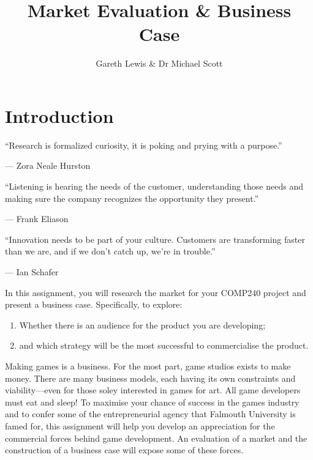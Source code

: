 \documentclass{../../fal_assignment}
\title{Market Evaluation \& Business Case}
\author{Gareth Lewis \& Dr Michael Scott}
\begin{document}
\maketitle

\section*{Introduction}

\begin{marginquote}
  ``Research is formalized curiosity, it is poking and prying with a purpose.''
  
   --- Zora Neale Hurston
   
    \marginquoterule
    
    ``Listening is hearing the needs of the customer, understanding those needs and making sure the company recognizes the opportunity they present.''
    
    --- Frank Eliason
    
    \marginquoterule
    
    ``Innovation needs to be part of your culture. Customers are transforming faster than we are, and if we don't catch up, we're in trouble.''
    
    --- Ian Schafer
      
\end{marginquote}

In this assignment, you will research the market for your COMP240 project and present a business case. Specifically, to explore: 

\begin{enumerate}[label=(\roman*)]
    \item Whether there is an audience for the product you are developing;
    \item and which strategy will be the most successful to commercialise the product.
\end{enumerate}

Making games is a business. For the most part, game studios exists to make money. There are many business models, each having its own constraints and viability---even for those soley interested in games for art. All game developers must eat and sleep! To maximise your chance of success in the games industry and to confer some of the entrepreneurial agency that Falmouth University is famed for, this assignment will help you develop an appreciation for the commercial forces behind game development. An evaluation of a market and the construction of a business case will expose some of these forces.
\end{document}
